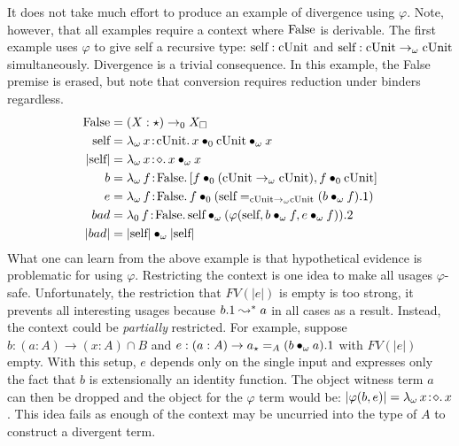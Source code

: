 It does not take much effort to produce an example of divergence using $\varphi$.
Note, however, that all examples require a context where $\textnormal{False}$ is derivable.
The first example uses $\varphi$ to give self a recursive type: $\textnormal{self} : \textnormal{cUnit}$ and $\textnormal{self} : \textnormal{cUnit} \to_\omega \textnormal{cUnit}$ simultaneously.
Divergence is a trivial consequence.
In this example, the False premise is erased, but note that conversion requires reduction under binders regardless.
\begin{align*}
    \pFalse &= (X : \star) \to_0 X_\square \\
    \pself &= \abs{\lambda_\omega}{x}{\pUnit}{
        \apptwo{x}{0}{\pUnit}{\omega}{x}
    } \\
    |\pself| &= \abs{\lambda_\omega}{x}{\diamond}{\app{x}{\omega}{x}} \\
    b &= \abs{\lambda_\omega}{f}{\pFalse}{
        [
            \app{f}{0}{(\pUnit \to_\omega \pUnit)},
            \app{f}{0}{\pUnit}
        ]
    } \\
    e &= \abs{\lambda_\omega}{f}{\pFalse}{
        \app{f}{0}{
            (\pself =_{\pUnit \to_\omega \pUnit} (\app{b}{\omega}{f}).1)
        }
    } \\
    bad &= \abs{\lambda_0}{f}{\pFalse}{
        \app{\pself}{\omega}{
            (
                \varphi(\pself, \app{b}{\omega}{f}, \app{e}{\omega}{f})
            ).2
        }
    } \\
    |bad| &= \app{|\pself|}{\omega}{|\pself|}
\end{align*}
What one can learn from the above example is that hypothetical evidence is problematic for using $\varphi$.
Restricting the context is one idea to make all usages $\varphi$-safe.
Unfortunately, the restriction that $FV(|e|)$ is empty is too strong, it prevents all interesting usages because $b.1 \leadsto^* a$ in all cases as a result.
Instead, the context could be \textit{partially} restricted.
For example, suppose $b : (a : A) \to (x : A) \cap B$ and $e : (a : A) \to a_\star =_A (b \bullet_{\omega} a).1$ with $FV(|e|)$ empty.
With this setup, $e$ depends only on the single input and expresses only the fact that $b$ is extensionally an identity function.
The object witness term $a$ can then be dropped and the object for the $\varphi$ term would be: $|\varphi(b, e)| = {\lambda_\omega}\, x\! : \! \diamond.\, x$.
This idea fails as enough of the context may be uncurried into the type of $A$ to construct a divergent term.
